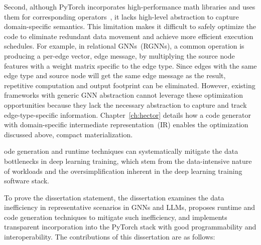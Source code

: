 Second, although PyTorch incorporates high-performance math libraries and uses them for corresponding operators~\cite{CuBLAS,CUTLASS2022}, it lacks high-level abstraction to capture domain-specific semantics. This limitation makes it difficult to safely optimize the code to eliminate redundant data movement and achieve more efficient execution schedules. For example, in relational GNNs~(RGNNs), a common operation is producing a per-edge vector, edge message, by multiplying the source node features with a weight matrix specific to the edge type. Since edges with the same edge type and source node will get the same edge message as the result, repetitive computation and output footprint can be eliminated. However, existing frameworks with generic GNN abstraction cannot leverage these optimization opportunities because they lack the necessary abstraction to capture and track edge-type-specific information. Chapter~\ref{ch:hector} details how a code generator with domain-specific intermediate representation~(IR) enables the optimization discussed above, compact materialization.



ode generation and runtime techniques can systematically mitigate the data  bottlenecks in deep learning training, which stem from the data-intensive nature of workloads and the oversimplification inherent in the deep learning training software stack.

To prove the dissertation statement, the dissertation examines the data inefficiency in representative scenarios in GNNs and LLMs, proposes runtime and code generation techniques to mitigate such inefficiency, and implements transparent incorporation into the PyTorch stack with good programmability and interoperability. 
The contributions of this dissertation are as follows:



